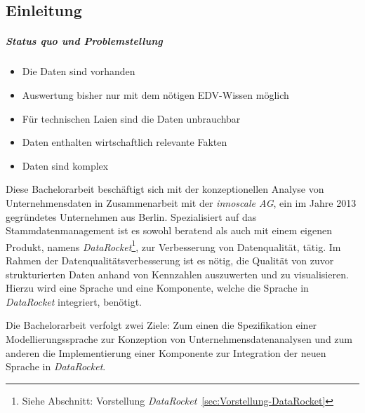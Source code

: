 \documentclass[
  language=german, %
  type=bachelor%
]{isthesis}
\begin{document}
\begin{content}



  \chapter{Einleitung}


  \paragraph{Status quo und Problemstellung}
  \begin{itemize}
    \item Die Daten sind vorhanden
    \item Auswertung bisher nur mit dem nötigen EDV-Wissen möglich
    \item Für technischen Laien sind die Daten unbrauchbar
    \item Daten enthalten wirtschaftlich relevante Fakten
    \item Daten sind komplex
  \end{itemize}

  Diese Bachelorarbeit beschäftigt sich mit der
  konzeptionellen Analyse von Unternehmensdaten in Zusammenarbeit mit der
  \textit{innoscale AG}, ein im Jahre 2013 gegründetes Unternehmen aus Berlin.
  Spezialisiert auf das Stammdatenmanagement ist es sowohl beratend als auch
  mit einem eigenen Produkt, namens \textit{DataRocket}\footnote{Siehe
  Abschnitt: Vorstellung \textit{DataRocket}~\ref{sec:Vorstellung-DataRocket}}, zur
  Verbesserung von Datenqualität, tätig. Im Rahmen der
  Datenqualitätsverbesserung ist es nötig, die Qualität von zuvor
  strukturierten Daten anhand von Kennzahlen auszuwerten und zu visualisieren.
  Hierzu wird eine Sprache und eine Komponente, welche die Sprache in \textit{DataRocket} integriert,
  benötigt.

  Die Bachelorarbeit verfolgt zwei Ziele: Zum einen die Spezifikation einer
  Modellierungssprache zur Konzeption von Unternehmensdatenanalysen und zum
  anderen die Implementierung einer Komponente zur
  Integration der neuen Sprache in \textit{DataRocket}.


\end{content}
\end{document}
